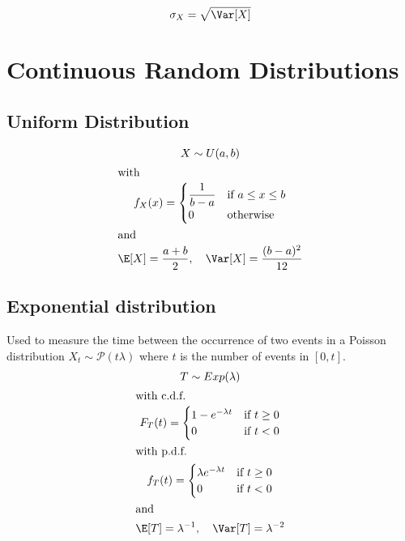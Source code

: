\begin{equation*}
    \sigma_X = \sqrt{\Var[X]}
\end{equation*}


\section{Continuous Random Distributions} %
\label{sec:continuous_random_distributions}

\subsection{Uniform Distribution} %
\label{sub:uniform_distribution}


\begin{gather*}
    X \sim U(a,b)\\
    \intertext{with}
    f_X(x)=
    \begin{cases}
        \dfrac{1}{b-a} & \text{if } a\leq x \leq b\\
                      0& \text{otherwise}
    \end{cases}\\
    \intertext{and}
    \E[X]=\dfrac{a+b}{2}, \quad\Var[X]=\dfrac{(b-a)^2}{12}
\end{gather*}


\subsection{Exponential distribution} %
\label{sub:exponential_distribution}

Used to measure the time between the occurrence of two events in a Poisson
distribution $X_t\sim\mathcal{P}(t\lambda)$ where $t$ is the number of events in
$[0,t]$.
\begin{gather*}
    T \sim Exp(\lambda)\\
    \intertext{with c.d.f.}
    F_T(t)=
    \begin{cases}
        1-e^{-\lambda t} & \text{if } t\geq 0\\
                        0& \text{if } t<0
    \end{cases}\\
    \intertext{with p.d.f.}
    f_T(t)=
    \begin{cases}
        \lambda e^{-\lambda t} & \text{if } t\geq 0\\
                              0& \text{if } t<0
    \end{cases}\\
    \intertext{and}
    \E[T]=\lambda^{-1}, \quad \Var[T]=\lambda^{-2}
\end{gather*}

